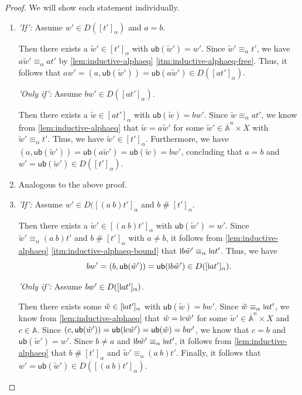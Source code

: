\documentclass[11pt,a4paper]{amsart}
\newcommand{\Names}{\mathbb{A}}
\newcommand{\barNames}{\overline{\Names}}
\newcommand{\alphaeq}{\equiv_\alpha}
\newcommand{\fresh}{\mathbin{\#}}
\theoremstyle{plain}
\newcommand{\midmid}{\hspace{0.2ex}{\rule[-0.1ex]{0.6pt}{1.65ex}}\hspace{0.2ex}}
\newcommand{\newletter}[1]{{\midmid}#1}
\newcommand{\ub}{\mathsf{ub}}
\numberwithin{equation}{section}
\newcommand{\+}[1]{\mathcal{#1}\xspace}
\theoremstyle{definition}
\begin{document}
\begin{proof}
  We will show each statement individually.
  \begin{enumerate}
    \item
      \emph{'If':}
      Assume \(w' \in D([t']_\alpha)\) and \(a = b\).

      Then there exists a \(\tilde{w}' \in [t']_\alpha\) with \(\ub(\tilde{w}') = w'\).
      Since \(\tilde{w}' \alphaeq t'\), we have \(a\tilde{w}' \alphaeq at'\) by \autoref{lem:inductive-alphaeq} \eqref{itm:inductive-alphaeq-free}.
      Thus, it follows that \(aw' = (a, \ub(\tilde{w}')) = \ub(a\tilde{w}') \in D([at']_\alpha)\).

      \emph{'Only if':}
      Assume \(bw' \in D([at']_\alpha)\).

      Then there exists a \(\tilde{w} \in [at']_\alpha\) with \(\ub(\tilde{w}) = bw'\).
      Since \(\tilde{w} \alphaeq at'\), we know from \autoref{lem:inductive-alphaeq} that \(\tilde{w} = a\tilde{w}'\) for some \(\tilde{w}' \in \barNames^n \times X\) with \(\tilde{w}' \alphaeq t'\).
      Thus, we have \(\tilde{w}' \in [t']_\alpha\).
      Furthermore, we have \((a, \ub(\tilde{w}')) = \ub(a\tilde{w}') = \ub(\tilde{w}) = bw'\), concluding that \(a = b\) and \(w' = \ub(\tilde{w}') \in D([t']_\alpha)\).
    \item
      Analogous to the above proof.
    \item
      \emph{'If':}
      Assume \(w' \in D([(a\ b)t']_\alpha\) and \(b \fresh [t']_\alpha\).

      Then there exists a \(\tilde{w}' \in [(a\ b)t']_\alpha\) with \(\ub(\tilde{w}') = w'\).
      Since \(\tilde{w}' \alphaeq (a\ b)t'\) and \(b \fresh [t']_\alpha\) with \(a \neq b\), it follows from \autoref{lem:inductive-alphaeq} \eqref{itm:inductive-alphaeq-bound} that \(\newletter{b}\tilde{w}' \alphaeq \newletter{a}t'\).
      Thus, we have
      \begin{equation*}
        bw' = (b, \ub(\tilde{w}')) = \ub(\newletter{b}\tilde{w}') \in D([\newletter{a}t']_\alpha).
      \end{equation*}

      \emph{'Only if':}
      Assume \(bw' \in D([\newletter{a}t']_\alpha)\).

      Then there exists some \(\tilde{w} \in [\newletter{a}t']_\alpha\) with \(\ub(\tilde{w}) = bw'\).
      Since \(\tilde{w} \alphaeq \newletter{a}t'\), we know from \autoref{lem:inductive-alphaeq} that \(\tilde{w} = \newletter{c}\tilde{w}'\) for some \(\tilde{w}' \in \barNames^n \times X\) and \(c \in \Names\).
      Since \((c, \ub(\tilde{w}')) = \ub(\newletter{c}\tilde{w}') = \ub(\tilde{w}) = bw'\), we know that \(c = b\) and \(\ub(\tilde{w}') = w'\).
      Since \(b \neq a\) and \(\newletter{b}\tilde{w}' \alphaeq \newletter{a}t'\), it follows from \autoref{lem:inductive-alphaeq} that \(b \fresh [t']_\alpha\) and \(\tilde{w}' \alphaeq (a\ b)t'\).
      Finally, it follows that \(w' = \ub(\tilde{w}') \in D([(a\ b)t']_\alpha)\).
  \end{enumerate}
\end{proof}
\end{document}
